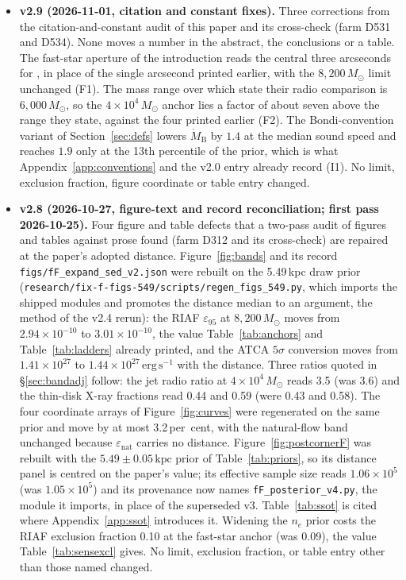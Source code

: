 \documentclass[11pt]{article}
\newcommand{\msun}{\ensuremath{M_\odot}}
\newcommand{\mdotB}{\ensuremath{\dot{M}_{\mathrm{B}}}}
\newcommand{\epsl}{\ensuremath{\varepsilon_{95}}}
\begin{document}
\begin{itemize}
Table~A.3 prints 95.923, 0.032\,pc\,cm$^{-3}$ apart and not a rounding, and that this paper uses the A.3 value.
\item \textbf{v2.9 (2026-11-01, citation and constant fixes).} Three corrections from the citation-and-constant audit of this paper and its cross-check (farm D531 and D534). None moves a number in the abstract, the conclusions or a table. The fast-star aperture of the introduction reads the central three arcseconds for \citet{Haberle2024Nature}, in place of the single arcsecond printed earlier, with the $8{,}200\,\msun$ limit unchanged (F1). The mass range over which \citet{Chen2025JWST} state their radio comparison is $6{,}000\,\msun$, so the $4\times10^{4}\,\msun$ anchor lies a factor of about seven above the range they state, against the four printed earlier (F2). The Bondi-convention variant of Section~\ref{sec:defs} lowers \mdotB{} by $1.4$ at the median sound speed and reaches $1.9$ only at the 13th percentile of the prior, which is what Appendix~\ref{app:conventions} and the v2.0 entry already record (I1). No limit, exclusion fraction, figure coordinate or table entry changed.
\item \textbf{v2.8 (2026-10-27, figure-text and record reconciliation; first pass 2026-10-25).} Four figure and table defects that a two-pass audit of figures and tables against prose found (farm D312 and its cross-check) are repaired at the paper's adopted distance. Figure~\ref{fig:bands} and its record \texttt{figs/fF\_expand\_sed\_v2.json} were rebuilt on the 5.49\,kpc draw prior (\texttt{research/fix-f-figs-549/scripts/regen\_figs\_549.py}, which imports the shipped modules and promotes the distance median to an argument, the method of the v2.4 rerun): the RIAF $\epsl$ at $8{,}200\,\msun$ moves from $2.94\times10^{-10}$ to $3.01\times10^{-10}$, the value Table~\ref{tab:anchors} and Table~\ref{tab:ladders} already printed, and the ATCA $5\sigma$ conversion moves from $1.41\times10^{27}$ to $1.44\times10^{27}\,\mathrm{erg\,s^{-1}}$ with the distance. Three ratios quoted in \S\ref{sec:bandadj} follow: the jet radio ratio at $4\times10^{4}\,\msun$ reads 3.5 (was 3.6) and the thin-disk X-ray fractions read 0.44 and 0.59 (were 0.43 and 0.58). The four coordinate arrays of Figure~\ref{fig:curves} were regenerated on the same prior and move by at most 3.2\,per~cent, with the natural-flow band unchanged because $\varepsilon_{\mathrm{nat}}$ carries no distance. Figure~\ref{fig:postcornerF} was rebuilt with the $5.49 \pm 0.05\,\mathrm{kpc}$ prior of Table~\ref{tab:priors}, so its distance panel is centred on the paper's value; its effective sample size reads $1.06\times10^{5}$ (was $1.05\times10^{5}$) and its provenance now names \texttt{fF\_posterior\_v4.py}, the module it imports, in place of the superseded v3. Table~\ref{tab:ssot} is cited where Appendix~\ref{app:ssot} introduces it. Widening the $n_{e}$ prior costs the RIAF exclusion fraction 0.10 at the fast-star anchor (was 0.09), the value Table~\ref{tab:sensexcl} gives. No limit, exclusion fraction, or table entry other than those named changed.


\end{itemize}
\end{document}
